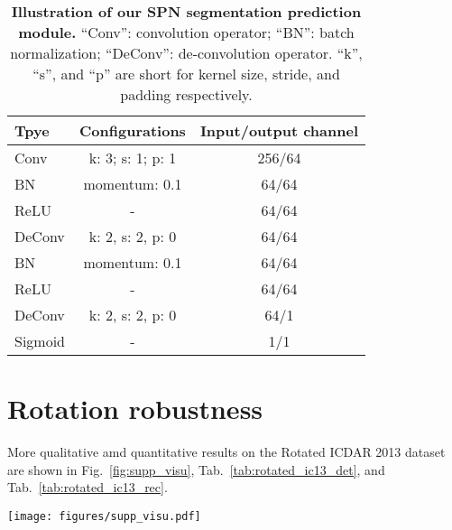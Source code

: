 \documentclass[runningheads]{llncs}
\begin{document}
\begin{table}[ht]
    \setlength{\tabcolsep}{8.0pt}
    \centering
    \caption{\textbf{Illustration of our SPN segmentation prediction module.} ``Conv'': convolution operator; ``BN'': batch normalization; ``DeConv'': de-convolution operator. ``k'', ``s'', and ``p'' are short for kernel size, stride, and padding respectively.}
    \begin{tabularx}{0.65\linewidth}{@{}lcc@{}}
    \toprule
    Tpye    & Configurations           & Input/output channel \\ 
    \midrule
    Conv    & k: 3; s: 1; p: 1         & 256/64               \\ 
    BN      & momentum: 0.1 & 64/64                \\ 
    ReLU    & -                        & 64/64                \\ 
    DeConv  & k: 2, s: 2, p: 0         & 64/64                \\ 
    BN      & momentum: 0.1 & 64/64                \\ 
    ReLU    & -                        & 64/64                \\ 
    DeConv  & k: 2, s: 2, p: 0         & 64/1                 \\ 
    Sigmoid & -                        & 1/1                  \\ 
    \bottomrule
    \end{tabularx}
    \label{tab:predict}
\end{table}

\section{Rotation robustness}
More qualitative amd quantitative results on the Rotated ICDAR 2013 dataset are shown in Fig.~\ref{fig:supp_visu}, Tab.~\ref{tab:rotated_ic13_det}, and Tab.~\ref{tab:rotated_ic13_rec}.

\begin{figure*}[ht]
    \centering
    \texttt{[image: figures/supp\_visu.pdf]}
    \caption{\textbf{Qualitative results on the Rotated ICDAR 2013 dataset.} The rotating angles are , , ,  , , and  for the columns from left to right.}
    \label{fig:supp_visu}
\end{figure*}
\end{document}
